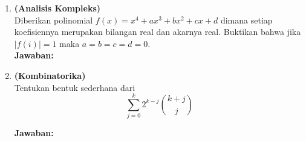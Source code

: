 \documentclass[12pt,a4paper]{article}
\begin{document}
\begin{enumerate}
        \newpage

  \item \textbf{(Analisis Kompleks)}\\
        Diberikan polinomial $f(x)=x^{4}+ax^{3}+bx^{2}+cx+d$ dimana setiap koefisiennya merupakan bilangan real dan akarnya real. Buktikan bahwa jika $|f(i)|=1$ maka $a=b=c=d=0$.\\


        \textbf{Jawaban:}
        \par\vspace{0.1cm}\noindent
        \fbox{%
          \begin{minipage}[t][\dimexpr\textheight-\pagetotal-2.5cm\relax]{\dimexpr\linewidth-2\fboxsep-2\fboxrule\relax}
            \mbox{}
          \end{minipage}%
        }

        \newpage

  \item \textbf{(Kombinatorika)}\\
        Tentukan bentuk sederhana dari
        \[ \sum_{j=0}^{k} 2^{k-j} \binom{k+j}{j} \]


        \textbf{Jawaban:}
        \par\vspace{0.1cm}\noindent
        \fbox{%
          \begin{minipage}[t][\dimexpr\textheight-\pagetotal-2.5cm\relax]{\dimexpr\linewidth-2\fboxsep-2\fboxrule\relax}
            \mbox{}
          \end{minipage}%
        }

\end{enumerate} %
\end{document}
